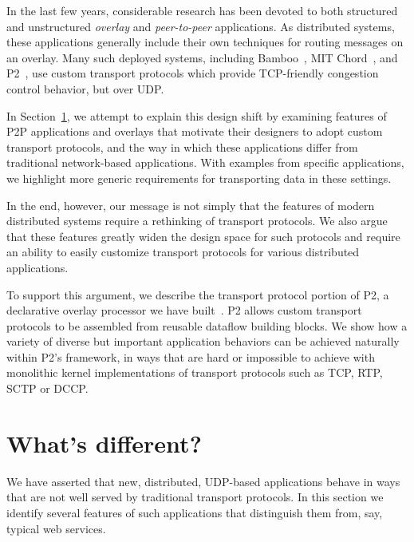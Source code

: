 \documentclass[10pt,twocolumn]{article}
\newcommand{\note}[1]{}
\begin{document}
\note{Paper outline Part 1: look at new apps with custom transport} 

In the last few years,
considerable research has been devoted to both structured and
unstructured \emph{overlay} and \emph{peer-to-peer} applications.  As
distributed systems, these applications generally include their own
techniques for routing messages on an overlay.   Many such deployed
systems, including Bamboo~\cite{rhea_usenix_2004}, MIT
Chord~\cite{chord}, and P2~\cite{p2:sosp}, use custom transport protocols which provide
 TCP-friendly congestion control behavior, but over UDP.

\note{Paper outline 2: What's different in the apps?  What's required
  of the transport?}  
In Section~\ref{sec:whatsdifferent}, we attempt to explain this design
shift by 
examining features of P2P applications and overlays that
motivate their designers to adopt custom transport protocols, and the
way in which these applications differ from traditional network-based
applications.  With examples from specific applications, we
highlight more generic requirements for transporting data in these
settings.

\note{Paper outline 3:  Flexible is required.}  In the
end, however, our message is not simply that the features of modern
distributed systems require a rethinking of transport protocols.  We
also argue that these features greatly widen the design space for such
protocols and require an ability to easily customize transport
protocols for various distributed applications.  

To support this argument, we describe the transport protocol portion
of P2, a declarative overlay processor we have built~\cite{p2:sosp}.
P2 allows custom transport protocols to be assembled
from reusable dataflow building blocks. We show how a
variety of diverse but important application behaviors can be 
achieved naturally within P2's framework, in ways that are hard
or impossible to achieve with monolithic kernel implementations of
transport protocols such as TCP, RTP, SCTP or DCCP. 

\section{What's different?}
\label{sec:whatsdifferent}

We have asserted that new, distributed, UDP-based applications behave
in ways that are not well served by traditional transport protocols.
In this section we identify several
features of such applications that distinguish them from, say, typical
web services.   
\end{document}
